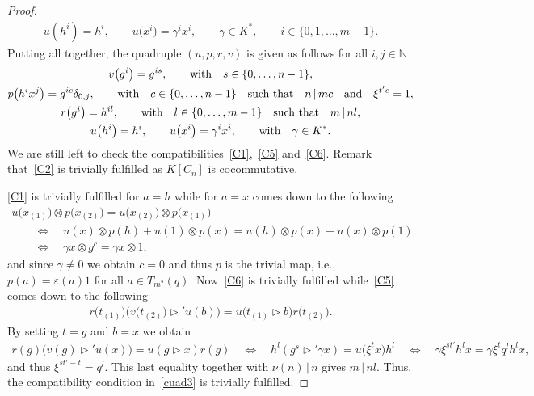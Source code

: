 \documentclass[11pt]{article}
\numberwithin{equation}{section}
\begin{document}
\begin{proof}
\begin{gather*}
u(h^{i}) = h^{i}, \qquad u\big(x^{i}\big) = \gamma^{i} x^{i}, \qquad \gamma \in K^{*}, \qquad i \in \{0, 1,\dots, m-1\}.
\end{gather*}
Putting all together, the quadruple $(u, p, r, v)$ is given as follows for all $i, j \in \mathbb{N}$
\begin{gather}
v\big(g^{i}\big) = g^{is}, \qquad {\rm with} \quad s \in \{ 0,\dots, n-1 \}, \nonumber\\ %
p\big(h^{i}x^{j}\big) = g^{ic} \delta_{0, j}, \qquad {\rm with} \quad c \in \{ 0,\dots, n-1 \} \quad \text{such that} \quad n \,|\, mc \quad {\rm and} \quad \xi^{t'c} = 1,\nonumber\\ %
r\big(g^{i}\big) = h^{il},\qquad {\rm with} \quad l \in \{ 0,\dots, m-1 \} \quad \text{such that} \quad m \,|\, nl,\label{cuad3}\\
u\big(h^{i}\big) = h^{i}, \qquad u\big(x^{i}\big) = \gamma^{i} x^{i}, \qquad {\rm with} \quad \gamma \in K^{*}. \nonumber %
\end{gather}
We are still left to check the compatibilities~\eqref{C1},~\eqref{C5} and~\eqref{C6}. Remark that~\eqref{C2} is trivially fulfilled as $K[C_{n}]$ is cocommutative.

\eqref{C1} is trivially fulfilled for $a = h$ while for $a = x$ comes down to the following
\begin{gather*}
 u\big(x_{(1)}\big) \otimes p\big(x_{(2)}\big) = u\big(x_{(2)}\big) \otimes p\big(x_{(1)}\big) \\
\qquad{} \Leftrightarrow \quad u(x) \otimes p(h) + u(1) \otimes p(x) = u(h) \otimes p(x) + u(x) \otimes p(1) \\
\qquad{} \Leftrightarrow \quad \gamma x \otimes g^{c} = \gamma x \otimes 1,
\end{gather*}
and since $\gamma \neq 0$ we obtain $c = 0$ and thus $p$ is the trivial map, i.e., $p(a) = \varepsilon(a) 1$ for all $a \in T_{m^{2}}(q)$. Now~\eqref{C6} is trivially fulfilled while~\eqref{C5} comes down to the following
\begin{gather*}
r\big(t_{(1)}\big) \big(v\big(t_{(2)}\big) \triangleright' u(b) \big) {=} u \big(t_{(1)} \triangleright b\big) r\big(t_{(2)}\big).
\end{gather*}
By setting $t = g$ and $b = x$ we obtain
\begin{gather*}
 r(g)\big(v(g) \triangleright' u(x) \big) = u(g \triangleright x) r(g)\quad
\!\Leftrightarrow\! \quad h^{l} (g^{s} \triangleright' \gamma x) = u\big(\xi^{t} x\big)h^{l}\quad
\!\Leftrightarrow\!\quad \gamma \xi^{st'} h^{l} x = \gamma \xi^{t} q^{l} h^{l} x,\!
\end{gather*}
and thus $\xi^{st' - t} = q^{l}$. This last equality together with $\nu(n) \,|\, n$ gives $m \,|\, nl$. Thus, the compatibility condition in~\eqref{cuad3} is trivially fulfilled.


\end{proof}
\end{document}
